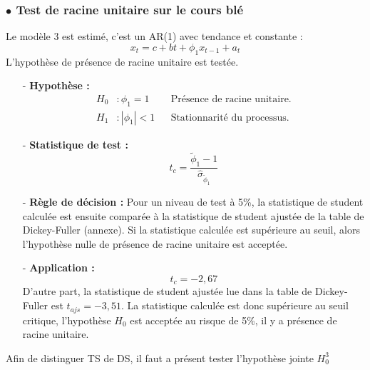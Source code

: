 \subsubsection*{$\bullet$ Test de racine unitaire sur le cours blé}
Le modèle 3 est estimé, c'est un AR(1) avec tendance et constante :
\begin{equation*}
    x_{t} = c + bt + \phi_{1} x_{t-1} + a_{t}
\end{equation*}
L'hypothèse de présence de racine unitaire est testée.
%
\begin{itemize}
\item[-]\textbf{ Hypothèse :} 
\begin{align*}
    H_{0} &: \phi_{1} = 1  & &\text{Présence de racine unitaire.}\\
    H_{1} &:|\phi_{1}| < 1   &  &\text{Stationnarité du processus.}
\end{align*}
\item[-]\textbf{Statistique de test :} 
\begin{equation*}
    t_{c} = \frac{\tilde{\phi}_{1}- 1}{\hat{\sigma}_{\tilde{\phi}_{1}}}
\end{equation*}
\item[-]\textbf{Règle de décision :} Pour un niveau de test à 5\%, la statistique de student calculée est ensuite comparée à la statistique de student ajustée de la table 
de Dickey-Fuller (annexe). Si la statistique calculée est supérieure au seuil, alors l'hypothèse nulle de présence de racine unitaire est acceptée.
\item[-]\textbf{Application :} 
\begin{equation*}
    t_{c} = -2,67
\end{equation*}
D'autre part, la statistique de student ajustée lue dans la table de Dickey-Fuller est $t_{ajs} = - 3,51$. La statistique calculée est donc supérieure au seuil critique,
l'hypothèse $H_{0}$ est acceptée au risque de 5\%, il y a présence de racine unitaire.
\end{itemize}
%
Afin de distinguer TS de DS, il faut a présent tester l'hypothèse jointe $H_{0}^{3}$
%
